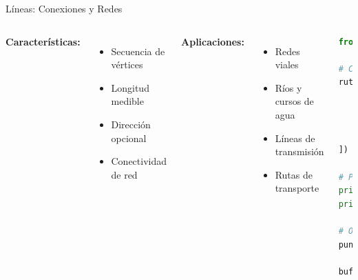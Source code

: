 \documentclass[10pt,aspectratio=169]{beamer}
\begin{document}
\begin{frame}[fragile]{Líneas: Conexiones y Redes}
    \begin{columns}[T]
        \textbf{Características:}
        \begin{itemize}
            \item Secuencia de vértices
            \item Longitud medible
            \item Dirección opcional
            \item Conectividad de red
        \end{itemize}
        
        \textbf{Aplicaciones:}
        \begin{itemize}
            \item Redes viales
            \item Ríos y cursos de agua
            \item Líneas de transmisión
            \item Rutas de transporte
        \end{itemize}
        
        \begin{lstlisting}[language=Python]
from shapely.geometry import LineString

# Crear linea
ruta = LineString([
    (-70.651, -33.438),
    (-70.649, -33.437),
    (-70.648, -33.439),
    (-70.650, -33.441)
])

# Propiedades
print(f"Longitud: {ruta.length}")
print(f"Vertices: {len(ruta.coords)}")

# Operaciones
punto_medio = ruta.interpolate(0.5, 
                              normalized=True)
buffer_ruta = ruta.buffer(0.001)
        \end{lstlisting}
    \end{columns}
\end{frame}
\end{document}
